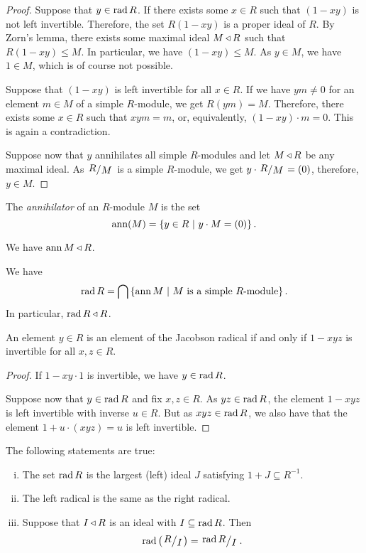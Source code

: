 \begin{proof}
Suppose that $y \in \operatorname{rad} R$. If there exists some $x \in R$ such
that $(1 - xy)$ is not left invertible. Therefore, the set
$R (1 - xy)$ is a proper ideal of $R$. By Zorn's lemma, there
exists some maximal ideal $M \triangleleft R$ such that $R (1 - xy) \leq M$.
In particular, we have $(1 - xy) \leq M$. As $y \in M$, we have
$1 \in M$, which is of course not possible.

Suppose that $(1 - xy)$ is left invertible for all $x \in R$. If
we have $ym \ne 0$ for an element $m \in M$ of a simple $R$-module,
we get $R(ym) = M$. Therefore, there exists some $x \in R$ such
that $xym = m$, or, equivalently, $(1 - xy) \cdot m = 0$. This is
again a contradiction.

Suppose now that $y$ annihilates all simple $R$-modules and let
$M \triangleleft R$ be any maximal ideal. As $\kvoc{R}{M}$ is a simple
$R$-module, we get $y \cdot \kvoc{R}{M} = (0)$, therefore,
$y \in M$.
\end{proof}

\begin{definicija}
The \emph{annihilator} of an $R$-module $M$ is
the set
\[
\operatorname{ann}(M) = \left\{y \in R~\middle\vert~y \cdot M = (0)\right\}.
\]
\end{definicija}

\begin{opomba}
We have $\operatorname{ann} M \triangleleft R$.
\end{opomba}

\begin{posledica}
We have
\[
\operatorname{rad} R = \bigcap \left\{\operatorname{ann} M~\middle\vert~\text{$M$ is a simple $R$-module}\right\}.
\]
In particular, $\operatorname{rad} R \triangleleft R$.
\end{posledica}

\begin{lema}
An element $y \in R$ is an element of the Jacobson radical if and
only if $1 - xyz$ is invertible for all $x, z \in R$.
\end{lema}

\begin{proof}
If $1 - xy \cdot 1$ is invertible, we have $y \in \operatorname{rad} R$.

Suppose now that $y \in \operatorname{rad} R$ and fix $x, z \in R$. As
$yz \in \operatorname{rad} R$, the element $1 - xyz$ is left invertible with
inverse $u \in R$. But as $xyz \in \operatorname{rad} R$, we also have that the
element $1 + u \cdot (xyz) = u$ is left invertible.
\end{proof}

\begin{trditev}
The following statements are true:

\begin{enumerate}[i)]
\item The set $\operatorname{rad} R$ is the largest (left) ideal $J$ satisfying
$1 + J \subseteq R^{-1}$.
\item The left radical is the same as the right radical.
\item Suppose that $I \triangleleft R$ is an ideal with
$I \subseteq \operatorname{rad} R$. Then
\[
\rad \br{\kvoc{R}{I}} = \kvoc{\rad R}{I}.
\]
\end{enumerate}
\end{trditev}

